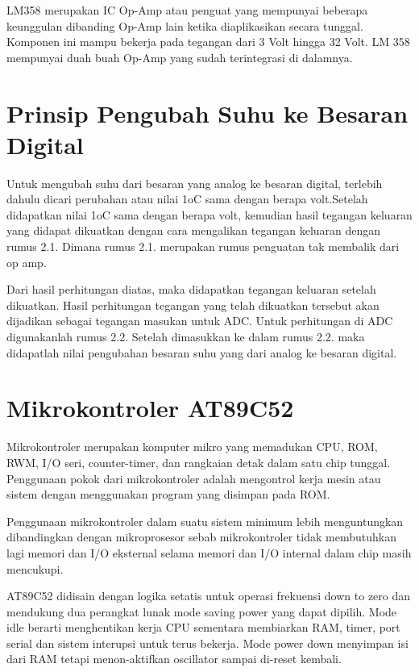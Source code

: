 \documentclass{jtetiproposalskripsi}
\begin{document}
LM358 merupakan IC Op-Amp atau penguat yang mempunyai beberapa keunggulan dibanding Op-Amp lain ketika diaplikasikan secara tunggal. Komponen ini mampu bekerja pada tegangan dari 3 Volt hingga 32 Volt. LM 358 mempunyai duah buah Op-Amp yang sudah terintegrasi di dalamnya.


\section{Prinsip Pengubah Suhu ke Besaran Digital}
Untuk mengubah suhu dari besaran yang analog ke besaran digital, terlebih dahulu dicari perubahan atau nilai 1oC sama dengan berapa volt.Setelah didapatkan nilai 1oC sama dengan berapa volt, kemudian hasil tegangan keluaran yang didapat dikuatkan dengan cara mengalikan tegangan keluaran dengan rumus 2.1. Dimana rumus 2.1. merupakan rumus penguatan tak membalik dari op amp.




Dari hasil perhitungan diatas, maka didapatkan tegangan keluaran setelah dikuatkan. Hasil perhitungan tegangan yang telah dikuatkan tersebut akan dijadikan sebagai tegangan masukan untuk ADC. Untuk perhitungan di ADC digunakanlah rumus 2.2. Setelah dimasukkan ke dalam rumus 2.2. maka didapatlah nilai pengubahan besaran suhu yang dari analog ke besaran digital. 

\section{Mikrokontroler AT89C52 }
Mikrokontroler merupakan komputer mikro yang memadukan  CPU, ROM, RWM, I/O seri, counter-timer, dan rangkaian detak dalam satu chip tunggal. Penggunaan pokok dari mikrokontroler adalah mengontrol kerja mesin atau sistem dengan menggunakan program yang disimpan pada ROM.




Penggunaan mikrokontroler dalam suatu sistem minimum lebih menguntungkan dibandingkan dengan mikroprosesor sebab  mikrokontroler tidak membutuhkan lagi memori dan I/O eksternal selama memori dan I/O internal dalam chip masih mencukupi.




AT89C52 didisain dengan logika setatis untuk operasi frekuensi down to zero dan mendukung dua perangkat lunak mode saving power yang dapat dipilih. Mode idle berarti menghentikan kerja CPU sementara membiarkan RAM, timer, port serial dan sistem interupsi untuk terus bekerja. Mode power down menyimpan isi dari RAM tetapi menon-aktifkan oscillator sampai di-reset kembali.
\end{document}
